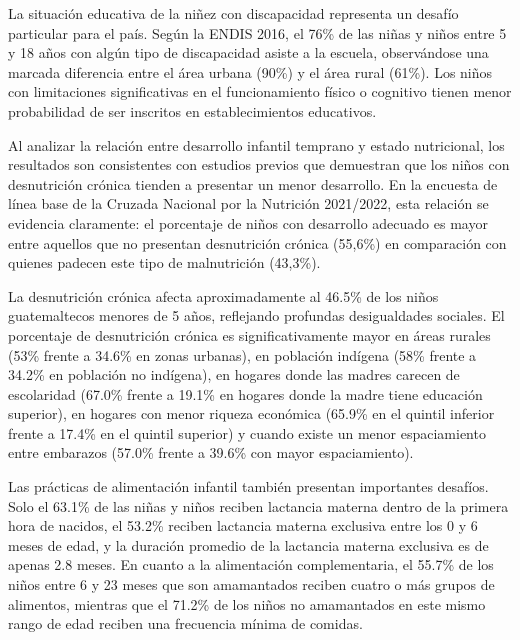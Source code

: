 \documentclass[11pt,letterpaper]{report}
\begin{document}
La situación educativa de la niñez con discapacidad representa un desafío
particular para el país. Según la ENDIS 2016, el 76\% de las niñas y niños
entre 5 y 18 años con algún tipo de discapacidad asiste a la escuela,
observándose una marcada diferencia entre el área urbana (90\%) y el área rural
(61\%). Los niños con limitaciones significativas en el funcionamiento físico o
cognitivo tienen menor probabilidad de ser inscritos en establecimientos
educativos. \cite{PoliticaInfanciaGuate}

Al analizar la relación entre desarrollo infantil temprano y estado
nutricional, los resultados son consistentes con estudios previos que
demuestran que los niños con desnutrición crónica tienden a presentar un menor
desarrollo. En la encuesta de línea base de la Cruzada Nacional por la
Nutrición 2021/2022, esta relación se evidencia claramente: el porcentaje de
niños con desarrollo adecuado es mayor entre aquellos que no presentan
desnutrición crónica (55,6\%) en comparación con quienes padecen este tipo de
malnutrición (43,3\%). \cite{SESAN2022}

La desnutrición crónica afecta aproximadamente al 46.5\% de los niños
guatemaltecos menores de 5 años, reflejando profundas desigualdades sociales.
El porcentaje de desnutrición crónica es significativamente mayor en áreas
rurales (53\% frente a 34.6\% en zonas urbanas), en población indígena (58\%
frente a 34.2\% en población no indígena), en hogares donde las madres carecen
de escolaridad (67.0\% frente a 19.1\% en hogares donde la madre tiene
educación superior), en hogares con menor riqueza económica (65.9\% en el
quintil inferior frente a 17.4\% en el quintil superior) y cuando existe un
menor espaciamiento entre embarazos (57.0\% frente a 39.6\% con mayor
espaciamiento). \cite{EnMaternoInfantil}

Las prácticas de alimentación infantil también presentan importantes desafíos.
Solo el 63.1\% de las niñas y niños reciben lactancia materna dentro de la
primera hora de nacidos, el 53.2\% reciben lactancia materna exclusiva entre
los 0 y 6 meses de edad, y la duración promedio de la lactancia materna
exclusiva es de apenas 2.8 meses. En cuanto a la alimentación complementaria,
el 55.7\% de los niños entre 6 y 23 meses que son amamantados reciben cuatro o
más grupos de alimentos, mientras que el 71.2\% de los niños no amamantados en
este mismo rango de edad reciben una frecuencia mínima de comidas.
\cite{EnMaternoInfantil} \cite{PoliticaInfanciaGuate}
\end{document}
